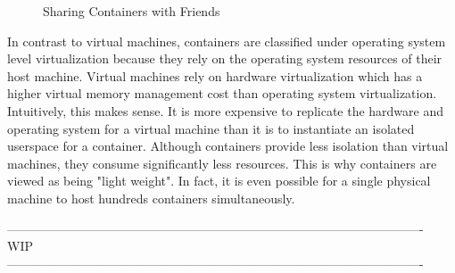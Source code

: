 \documentclass{article}
\begin{document}
\begin{figure}
\caption{Sharing Containers with Friends} 
\end{figure}
In contrast to virtual machines, containers are classified under operating system level virtualization
 because they rely on the operating system resources of their host machine. Virtual machines 
rely on hardware virtualization which has a higher virtual memory management cost than operating 
system virtualization. Intuitively, this makes sense. It is more expensive to replicate the hardware 
and operating system for a virtual machine than it is to instantiate an isolated userspace for a 
container. Although containers provide less isolation than virtual machines, they consume 
significantly less resources. This is why containers are viewed as being "light weight". 
In fact, it is even possible for a single physical machine to host hundreds containers simultaneously.

---------------------------------------------------------------------------------------------------- \\
 WIP \\
---------------------------------------------------------------------------------------------------- \\
\end{document}

